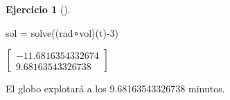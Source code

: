 \documentclass[
  a4paper,
]{scrreport}
\newenvironment{Shaded}{\begin{snugshade}}{\end{snugshade}}
\newcommand{\FloatTok}[1]{\textcolor[rgb]{0.68,0.00,0.00}{#1}}
\newcommand{\FunctionTok}[1]{\textcolor[rgb]{0.28,0.35,0.67}{#1}}
\newcommand{\NormalTok}[1]{\textcolor[rgb]{0.00,0.23,0.31}{#1}}
\newcommand{\OperatorTok}[1]{\textcolor[rgb]{0.37,0.37,0.37}{#1}}
\theoremstyle{definition}
\newtheorem{exercise}{Ejercicio}[chapter]
\theoremstyle{remark}
\begin{document}
\begin{exercise}[]
\begin{tcolorbox}
\begin{Shaded}
\begin{Highlighting}[]
\NormalTok{sol }\OperatorTok{=} \FunctionTok{solve}\NormalTok{((rad}\OperatorTok{∘}\NormalTok{vol)(t)}\OperatorTok{{-}}\FloatTok{3}\NormalTok{)}
\end{Highlighting}
\end{Shaded}

$\left[ \begin{array}{r}-11.6816354332674\\9.68163543326738\end{array} \right]$

El globo explotará a los 9.68163543326738 minutos.

\end{tcolorbox}

\end{exercise}
\end{document}
